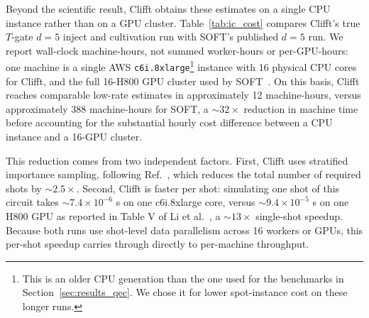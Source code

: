 \documentclass[a4paper, onecolumn, unpublished]{quantumarticle}
\begin{document}
    Beyond the scientific result, Clifft obtains these estimates on a single CPU instance rather than on a GPU cluster. Table~\ref{tab:ic_cost} compares Clifft's true $T$-gate $d{=}5$ inject and cultivation run with SOFT's published $d{=}5$ run. We report wall-clock machine-hours, not summed worker-hours or per-GPU-hours: one machine is a single AWS \texttt{c6i.8xlarge}\footnote{This is an older CPU generation than the one used for the benchmarks in Section~\ref{sec:results_qec}. We chose it for lower spot-instance cost on these longer runs.} instance with 16 physical CPU cores for Clifft, and the full 16-H800 GPU cluster used by SOFT~\cite{liSOFTHighperformanceSimulator2025}. On this basis, Clifft reaches comparable low-rate estimates in approximately 12 machine-hours, versus approximately 388 machine-hours for SOFT, a $\sim 32\times$ reduction in machine time before accounting for the substantial hourly cost difference between a CPU instance and a 16-GPU cluster.

    This reduction comes from two independent factors. First, Clifft uses stratified importance sampling, following Ref.~\cite{tuloupComputingLogicalError2026a}, which reduces the total number of required shots by $\sim 2.5\times$. Second, Clifft is faster per shot: simulating one shot of this circuit takes $\sim 7.4\times 10^{-6}$ s on one c6i.8xlarge core, versus $\sim 9.4\times 10^{-5}$ s on one H800 GPU as reported in Table V of Li et al.~\cite{liSOFTHighperformanceSimulator2025}, a $\sim 13\times$ single-shot speedup. Because both runs use shot-level data parallelism across 16 workers or GPUs, this per-shot speedup carries through directly to per-machine throughput.
\end{document}
